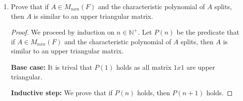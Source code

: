 \documentclass[11pt]{scrartcl}
\begin{document}
\begin{enumerate}[label=\alph*.]
{\begin{proof}
\begin{align*}
		      \end{align*}
		      We calculate the characteristic polynomial of $A$ by using the fact that $A'$ is an upper triangular matrix,
		      \begin{align*}
			      \text{det}(A - \lambda I) & = \text{det}(A' - \lambda I_n)        \\
			                                & = \prod_{i=1}^{n}(A'_{i,i} - \lambda)
		      \end{align*}
		      and $A$ splits as desired. Therefore, analogous result of (a) for matrices holds.
	      \end{proof}
	      }
	\item{
	      Prove that if $A \in M_{nxn}(F)$ and the characteristic polynomial
	      of $A$ splits, then $A$ is similar to an upper triangular matrix.
	      \begin{proof}
		      We proceed by induction on $n \in \mathbb{N}^+$.
		      Let $P(n)$ be the predicate that if $A \in M_{nxn}(F)$ and the characteristic polynomial
		      of $A$ splits, then $A$ is similar to an upper triangular matrix. \par
		      \textbf{Base case:} It is trival that $P(1)$ holds as all matrix $1x1$ are upper triangular. \par
		      \textbf{Inductive step:} We prove that if $P(n)$ holds, then $P(n + 1)$ holds.
	      \end{proof}
	      }
\end{enumerate}

\end{document}
